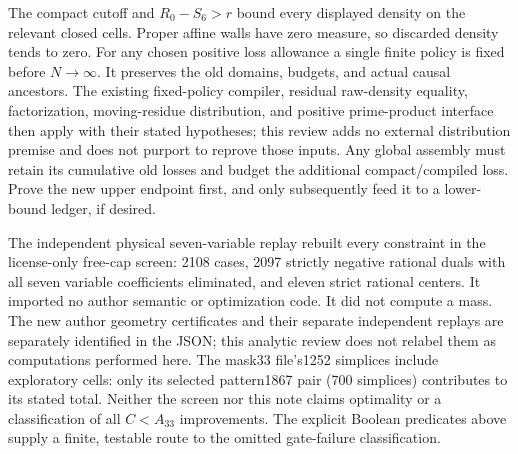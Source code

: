 The compact cutoff and $R_0-S_6>r$ bound every displayed density on
the relevant closed cells. Proper affine walls have zero measure, so
discarded density tends to zero. For any chosen positive loss allowance
a single finite policy is fixed before $N\to\infty$. It preserves the
old domains, budgets, and actual causal ancestors. The existing fixed-policy
compiler, residual raw-density equality, factorization, moving-residue
distribution, and positive prime-product interface then apply with their
stated hypotheses; this review adds no external distribution premise and
does not purport to reprove those inputs. Any global assembly must retain
its cumulative old losses and budget the additional compact/compiled loss.
Prove the new upper endpoint first, and only subsequently feed it to a
lower-bound ledger, if desired.

The independent physical seven-variable replay rebuilt every constraint
in the license-only free-cap screen: 2108 cases, 2097 strictly negative
rational duals with all seven variable coefficients eliminated, and eleven
strict rational centers. It imported no author semantic or optimization
code. It did not compute a mass. The new author geometry certificates and
their separate independent replays are separately identified in the JSON;
this analytic review does not relabel them as computations performed here.
The mask33 file's1252 simplices include exploratory cells: only its
selected pattern1867 pair (700 simplices) contributes to its stated total.
Neither the screen nor this note claims optimality or a classification of
all $C<A_{33}$ improvements. The explicit Boolean predicates above supply
a finite, testable route to the omitted gate-failure classification.
